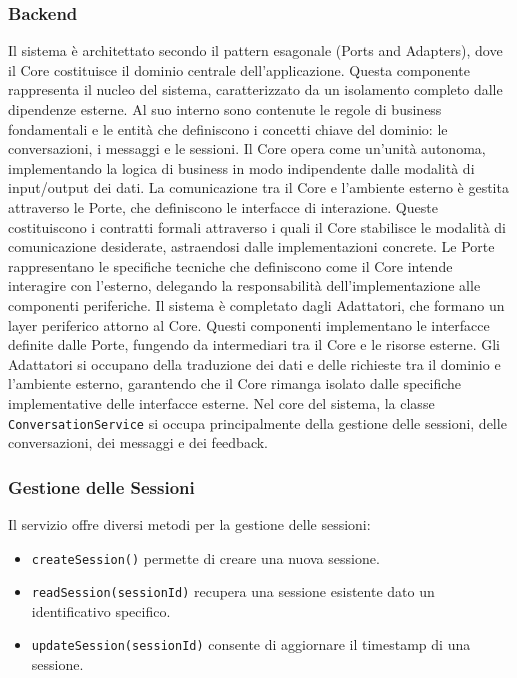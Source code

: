 \newpage
\subsubsection{Backend}
 Il sistema è architettato secondo il pattern esagonale (Ports and Adapters), dove il Core costituisce il dominio centrale dell'applicazione. Questa componente rappresenta il nucleo del sistema, caratterizzato da un isolamento completo dalle dipendenze esterne. Al suo interno sono contenute le regole di business fondamentali e le entità che definiscono i concetti chiave del dominio: le conversazioni, i messaggi e le sessioni. Il Core opera come un'unità autonoma, implementando la logica di business in modo indipendente dalle modalità di input/output dei dati.
\newline La comunicazione tra il Core e l'ambiente esterno è gestita attraverso le Porte, che definiscono le interfacce di interazione. Queste costituiscono i contratti formali attraverso i quali il Core stabilisce le modalità di comunicazione desiderate, astraendosi dalle implementazioni concrete. Le Porte rappresentano le specifiche tecniche che definiscono come il Core intende interagire con l'esterno, delegando la responsabilità dell'implementazione alle componenti periferiche.
\newline Il sistema è completato dagli Adattatori, che formano un layer periferico attorno al Core. Questi componenti implementano le interfacce definite dalle Porte, fungendo da intermediari tra il Core e le risorse esterne. Gli Adattatori si occupano della traduzione dei dati e delle richieste tra il dominio e l'ambiente esterno, garantendo che il Core rimanga isolato dalle specifiche implementative delle interfacce esterne.
Nel core del sistema, la classe \texttt{ConversationService} si occupa principalmente della gestione delle sessioni, delle conversazioni, dei messaggi e dei feedback.

\subsubsection*{Gestione delle Sessioni}
Il servizio offre diversi metodi per la gestione delle sessioni:
\begin{itemize}
    \item \texttt{createSession()} permette di creare una nuova sessione.
    \item \texttt{readSession(sessionId)} recupera una sessione esistente dato un identificativo specifico.
    \item \texttt{updateSession(sessionId)} consente di aggiornare il timestamp di una sessione.
\end{itemize}

